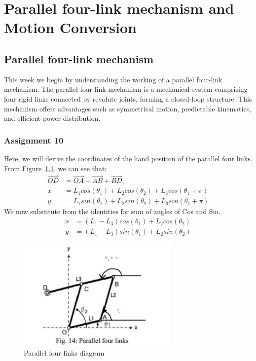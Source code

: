 \documentclass[12pt,a4paper]{report}
\begin{document}
\chapter{Parallel four-link mechanism and Motion Conversion}
\section{Parallel four-link mechanism}
This week we begin by understanding the working of a parallel four-link mechanism. 
The parallel four-link mechanism is a mechanical system comprising four rigid links connected by revolute joints, 
forming a closed-loop structure. This mechanism offers advantages such as symmetrical motion, predictable kinematics, 
and efficient power distribution.
\subsection{\textbf{Assignment 10}}
Here, we will derive the coordinates of the hand position of the parallel four links. 
From Figure~\ref{fig:ass10}, we can see that: 
\begin{align}
    \vec{OD} &= \vec{OA} + \vec{AB} + \vec{BD},\\
    x &= L_1 cos(\theta_1) + L_2 cos(\theta_2)+L_3cos(\theta_1+\pi)\\
    y &= L_1sin(\theta_1) + L_2 sin(\theta_2) +L_3sin(\theta_1+\pi)
\end{align}
We now substitute from the identities for sum of angles of Cos and Sin.
\begin{align}
    x &= (L_1-L_3)cos(\theta_1)+L_2cos(\theta_2)\\
    y &= (L_1-L_3)sin(\theta_1)+L_2sin(\theta_2)
\end{align}
\begin{figure}[htbp]
            \centering
    \includegraphics[width=0.7\textwidth]{figures/ass10}
    \caption{Parallel four links diagram}
    \label{fig:ass10}
\end{figure}
\end{document}
